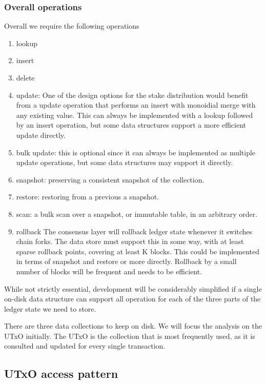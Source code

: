 \documentclass[11pt,a4paper]{article}
\begin{document}
\subsubsection{Overall operations}

Overall we require the following operations
\begin{enumerate}
  \item {\sc lookup}
  \item {\sc insert}
  \item {\sc delete}
  \item {\sc update}: One of the design options for the stake distribution
        would benefit from a update operation that performs an insert with
        monoidial merge with any existing value. This can always be implemented
        with a {\sc lookup} followed by an {\sc insert} operation, but some
        data structures support a more efficient {\sc update} directly.
  \item {\sc bulk update}: this is optional since it can always be implemented
        as multiple {\sc update} operations, but some data structures may
        support it directly.
  \item {\sc snapshot}: preserving a consistent snapshot of the collection.
  \item {\sc restore}: restoring from a previous a snapshot.
  \item {\sc scan}: a bulk scan over a snapshot, or immutable table, in an
        arbitrary order.
  \item {\sc rollback}
        \label{ROLLBACK}
        The consensus layer will rollback ledger state whenever it switches
        chain forks. The data store must support this in some way, with at
        least sparse rollback points, covering at least K blocks. This could
        be implemented in terms of {\sc snapshot} and {\sc restore} or more
        directly. Rollback by a small number of blocks will be frequent and
        needs to be efficient.
\end{enumerate}
While not strictly essential, development will be considerably simplified if
a single on-disk data structure can support all operation for each of the
three parts of the ledger state we need to store.

There are three data collections to keep on disk. We will focus the analysis on
the UTxO initially. The UTxO is the collection that is most frequently used, as
it is consulted and updated for every single transaction.

\subsection{UTxO access pattern}
\label{utxo-access-pattern}
\end{document}
